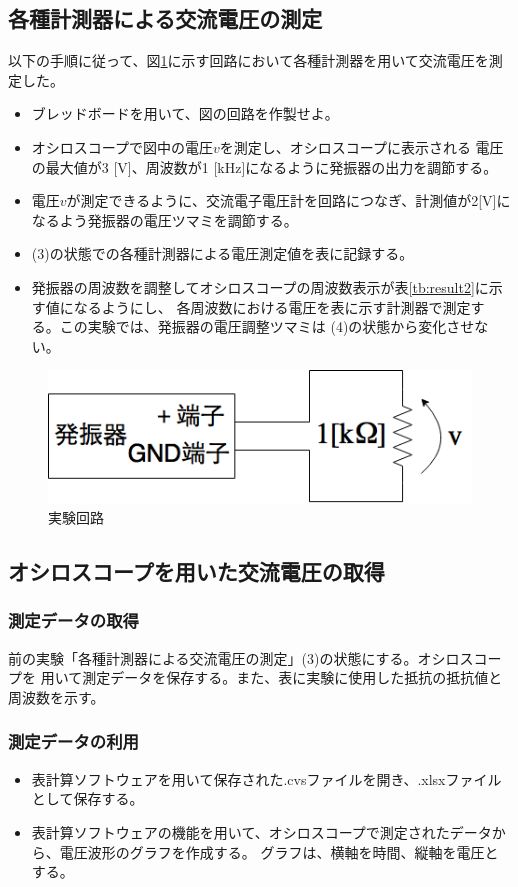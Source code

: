 \documentclass[dvipdfmx]{jsarticle}
\begin{document}
\subsection{各種計測器による交流電圧の測定}
以下の手順に従って、図\ref{fig:experimental_circuit}に示す回路において各種計測器を用いて交流電圧を測定した。
\begin{itemize}
  \item [(1)]ブレッドボードを用いて、図の回路を作製せよ。
  \item [(2)]オシロスコープで図中の電圧$v$を測定し、オシロスコープに表示される
            電圧の最大値が3 [V]、周波数が1 [kHz]になるように発振器の出力を調節する。
  \item [(3)]電圧$v$が測定できるように、交流電子電圧計を回路につなぎ、計測値が2[V]に
              なるよう発振器の電圧ツマミを調節する。
  \item [(4)](3)の状態での各種計測器による電圧測定値を表に記録する。
  \item [(5)]発振器の周波数を調整してオシロスコープの周波数表示が表\ref{tb:result2}に示す値になるようにし、
            各周波数における電圧を表に示す計測器で測定する。この実験では、発振器の電圧調整ツマミは
            (4)の状態から変化させない。
\end{itemize}
\begin{figure}[h]
  \centering
  \includegraphics[scale=0.4]{experimental_circuit.png}
  \caption{実験回路}
  \label{fig:experimental_circuit}
\end{figure}

\subsection{オシロスコープを用いた交流電圧の取得}
\subsubsection{測定データの取得}
前の実験「各種計測器による交流電圧の測定」(3)の状態にする。オシロスコープを
用いて測定データを保存する。また、表に実験に使用した抵抗の抵抗値と周波数を示す。
\subsubsection{測定データの利用}
\begin{itemize}
  \item [(1)]表計算ソフトウェアを用いて保存された.cvsファイルを開き、.xlsxファイルとして保存する。
  \item [(2)]表計算ソフトウェアの機能を用いて、オシロスコープで測定されたデータから、電圧波形のグラフを作成する。
            グラフは、横軸を時間、縦軸を電圧とする。
\end{itemize}
\end{document}
